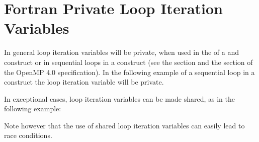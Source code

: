 \section{Fortran Private Loop Iteration Variables}
\label{sec:fort_loopvar}
\fortranspecificstart
{}

In general loop iteration variables will be private, when used in the  
of a  and  construct or in sequential loops in a 
 construct (see the  section and 
the  section of 
the OpenMP 4.0 specification). In the following example of a sequential 
loop in a  construct the loop iteration variable  will 
be private.


In exceptional cases, loop iteration variables can be made shared, as in the following 
example:


Note however that the use of shared loop iteration variables can easily lead to 
race conditions.
\fortranspecificend

